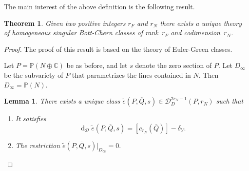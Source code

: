\documentclass[10pt,twoside]{article}
\numberwithin{equation}{section}
\theoremstyle{plain}
\newtheorem{theorem}[equation]{Theorem}
\newtheorem{lemma}[equation]{Lemma}
\theoremstyle{definition}
\DeclareMathOperator{\dd}{d}
\begin{document}
The main interest of the above definition is the following result.
\begin{theorem} \label{thm:9}
  Given two positive integers $r_{F}$ and $r_{N}$ there exists a
  unique theory of homogeneous singular Bott-Chern classes of
  rank~$r_{F}$ and codimension~$r_{N}$. 
\end{theorem}

\begin{proof}
  The proof of this result is based on the theory of Euler-Green
  classes. 

  Let $P=\mathbb{P}(N\oplus \mathbb{C})$ be as before, and let $s$
  denote the zero section of $P$. 
  Let $D_{\infty}$ be
  the subvariety of $P$ that parametrizes the lines contained in
  $N$. Then $D_{\infty}=\mathbb{P}(N)$.

  \begin{lemma}\label{lemm:4}
    There exists a unique class $\widetilde e(P,\overline Q,s)\in
    \mathcal{D}^{2r_{N}-1}_{D}(P,r_{N})$ such that
    \begin{enumerate}
    \item \label{item:4} It satisfies
      \begin{equation}
        \label{eq:30}
 \dd_{\mathcal{D}}\widetilde e(P,\overline
      Q,s)=[c_{r_{N}}(\overline Q)]-\delta _{Y}.       
      \end{equation}
    \item \label{item:5} The restriction $\widetilde e(P,\overline
      Q,s)|_{D_{\infty}}=0.$
    \end{enumerate}
  \end{lemma}


\end{proof}
\end{document}
